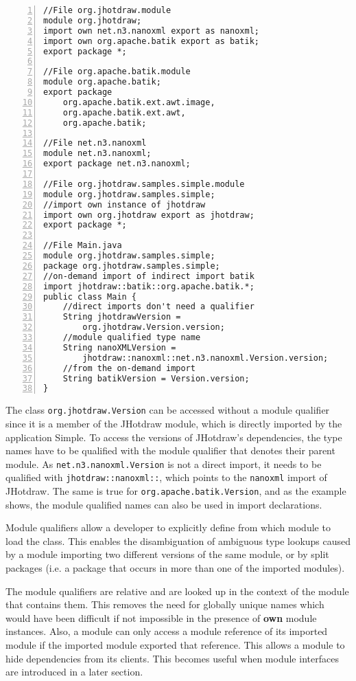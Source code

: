 \begin{lstlisting}[caption=Module Qualified Type References,numbers=left]
//File org.jhotdraw.module
module org.jhotdraw;
import own net.n3.nanoxml export as nanoxml;
import own org.apache.batik export as batik;
export package *;

//File org.apache.batik.module
module org.apache.batik;
export package 
	org.apache.batik.ext.awt.image,
	org.apache.batik.ext.awt,
	org.apache.batik;

//File net.n3.nanoxml
module net.n3.nanoxml;
export package net.n3.nanoxml;

//File org.jhotdraw.samples.simple.module
module org.jhotdraw.samples.simple;
//import own instance of jhotdraw
import own org.jhotdraw export as jhotdraw;
export package *;

//File Main.java
module org.jhotdraw.samples.simple;
package org.jhotdraw.samples.simple;
//on-demand import of indirect import batik
import jhotdraw::batik::org.apache.batik.*;
public class Main {
	//direct imports don't need a qualifier
	String jhotdrawVersion = 
		org.jhotdraw.Version.version;
	//module qualified type name
	String nanoXMLVersion = 
		jhotdraw::nanoxml::net.n3.nanoxml.Version.version;
	//from the on-demand import
	String batikVersion = Version.version;
}
\end{lstlisting}

The class \texttt{org.jhotdraw.Version} can be accessed without
a module qualifier since it is a member of the JHotdraw module, 
which is directly imported by the application Simple. To access
the versions of JHotdraw's dependencies, the type names have to
be qualified with the module qualifier that denotes their parent
module. As \texttt{net.n3.nanoxml.Version} is not a direct import,
it needs to be qualified with \texttt{jhotdraw::nanoxml::}, which
points to the \texttt{nanoxml} import of JHotdraw. The same is
true for \texttt{org.apache.batik.Version}, and as the example shows,
the module qualified names can also be used in import declarations.

Module qualifiers allow a developer to explicitly define from which module
to load the class. This enables the disambiguation of ambiguous type
lookups caused by a module importing two different versions of the same module, or
by split packages (i.e. a package that occurs in more than one of the imported modules).

The module qualifiers are relative and are looked up in the context 
of the module that contains them. This removes the need for globally
unique names which would have been difficult if not impossible in the
presence of \textbf{own} module instances. Also, a module can only
access a module reference of its imported module if the imported module
exported that reference. This allows a module to hide dependencies from
its clients. This becomes useful when module interfaces are introduced
in a later section.

